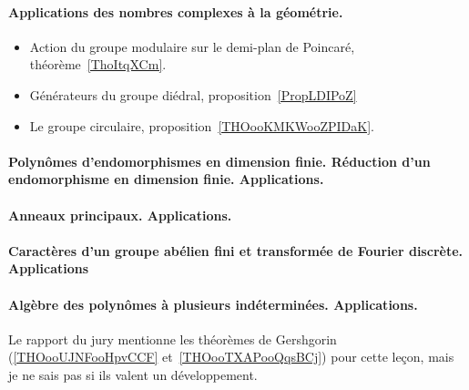 \paragraph{Applications des nombres complexes à la géométrie.}
\begin{itemize}
    \item Action du groupe modulaire sur le demi-plan de Poincaré, théorème~\ref{ThoItqXCm}.
    \item Générateurs du groupe diédral, proposition~\ref{PropLDIPoZ}
    \item Le groupe circulaire, proposition~\ref{THOooKMKWooZPIDaK}.
\end{itemize}
\paragraph{Polynômes d'endomorphismes en dimension finie. Réduction d'un endomorphisme en dimension finie. Applications.}
\paragraph{Anneaux principaux. Applications.}
\paragraph{Caractères d'un groupe abélien fini et transformée de Fourier discrète. Applications}
\paragraph{Algèbre des polynômes à plusieurs indéterminées. Applications.}

Le rapport du jury mentionne les théorèmes de Gershgorin (\ref{THOooUJNFooHpvCCF} et~\ref{THOooTXAPooQqsBCj}) pour cette leçon, mais je ne sais pas si ils valent un développement.

